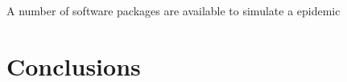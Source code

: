 \documentclass[a4paper,oneside,11pt]{article}
\begin{document}
{A number of software packages are available to simulate a epidemic 


  
   
 
 
 
\section{Conclusions}

}
\end{document}
